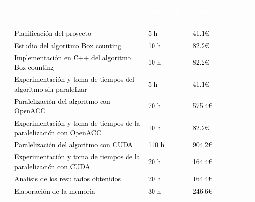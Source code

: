 \begin{table}[H]
    \centering
    \begin{adjustbox}{max height=\textheight,max width=\textwidth}
    \begin{tabular}{|clllrrl|} 
    \hline
    \rowcolor{black} \multicolumn{1}{|l}{}  & \textcolor{white}{Tareas} & \textcolor{white}{Duración (h)}         & \textcolor{white}{Importe (€)} \\                                      
    \hline
    \rowcolor{white} \multicolumn{1}{|l}{}  & \textcolor{black}{Planificación del proyecto} & \textcolor{black}{5 h}         & \textcolor{black}{41.1€} &\\
    \hline
    \rowcolor{white} \multicolumn{1}{|l}{}  & \textcolor{black}{Estudio del algoritmo Box counting} & \textcolor{black}{10 h}         & \textcolor{black}{82.2€} &\\  
    \hline
    \rowcolor{white} \multicolumn{1}{|l}{}  & \textcolor{black}{Implementación en C++ del algoritmo Box counting} & \textcolor{black}{10 h}         & \textcolor{black}{82.2€} \\
    \hline
    \rowcolor{white} \multicolumn{1}{|l}{}  & \textcolor{black}{Experimentación y toma de tiempos del algoritmo sin paralelizar} & \textcolor{black}{5 h}         & \textcolor{black}{41.1€}&\\
    \hline
    \rowcolor{white} \multicolumn{1}{|l}{}  & \textcolor{black}{Paralelización del algoritmo con OpenACC} & \textcolor{black}{70 h}         & \textcolor{black}{575.4€} &\\
    \hline
    \rowcolor{white} \multicolumn{1}{|l}{}  & \textcolor{black}{Experimentación y toma de tiempos de la paralelización con OpenACC} & \textcolor{black}{10 h}         & \textcolor{black}{82.2€} &\\
    \hline
    \rowcolor{white} \multicolumn{1}{|l}{}  & \textcolor{black}{Paralelización del algoritmo con CUDA} & \textcolor{black}{110 h}         & \textcolor{black}{904.2€} \\
    \hline
    \rowcolor{white} \multicolumn{1}{|l}{}  & \textcolor{black}{Experimentación y toma de tiempos de la paralelización con CUDA} & \textcolor{black}{20 h}         & \textcolor{black}{164.4€} &\\
    \hline
    \rowcolor{white} \multicolumn{1}{|l}{}  & \textcolor{black}{Análisis de los resultados obtenidos} & \textcolor{black}{20 h}         & \textcolor{black}{164.4€} &\\
    \hline
    \rowcolor{white} \multicolumn{1}{|l}{}  & \textcolor{black}{Elaboración de la memoria} & \textcolor{black}{30 h}  &\textcolor{black}{246.6€}&\\

\end{tabular}
\end{adjustbox}
\end{table}
